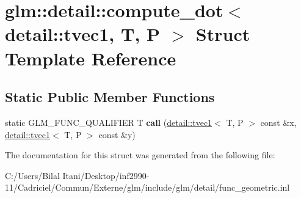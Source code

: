 \hypertarget{structglm_1_1detail_1_1compute__dot_3_01detail_1_1tvec1_00_01_t_00_01_p_01_4}{}\section{glm\+:\+:detail\+:\+:compute\+\_\+dot$<$ detail\+:\+:tvec1, T, P $>$ Struct Template Reference}
\label{structglm_1_1detail_1_1compute__dot_3_01detail_1_1tvec1_00_01_t_00_01_p_01_4}
\subsection*{Static Public Member Functions}
\begin{DoxyCompactItemize}
\item 
static G\+L\+M\+\_\+\+F\+U\+N\+C\+\_\+\+Q\+U\+A\+L\+I\+F\+I\+ER T {\bfseries call} (\hyperlink{structglm_1_1detail_1_1tvec1}{detail\+::tvec1}$<$ T, P $>$ const \&x, \hyperlink{structglm_1_1detail_1_1tvec1}{detail\+::tvec1}$<$ T, P $>$ const \&y)\hypertarget{structglm_1_1detail_1_1compute__dot_3_01detail_1_1tvec1_00_01_t_00_01_p_01_4_a8a857cb8e3ad91ffec9e5d2e8517be41}{}\label{structglm_1_1detail_1_1compute__dot_3_01detail_1_1tvec1_00_01_t_00_01_p_01_4_a8a857cb8e3ad91ffec9e5d2e8517be41}

\end{DoxyCompactItemize}


The documentation for this struct was generated from the following file\+:\begin{DoxyCompactItemize}
\item 
C\+:/\+Users/\+Bilal Itani/\+Desktop/inf2990-\/11/\+Cadriciel/\+Commun/\+Externe/glm/include/glm/detail/func\+\_\+geometric.\+inl\end{DoxyCompactItemize}
